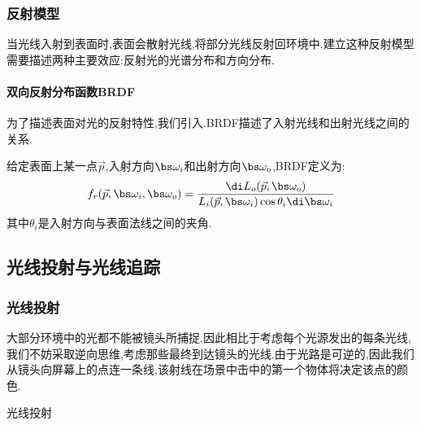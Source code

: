 \documentclass{ctexart}
\begin{document}
\subsubsection{反射模型}
当光线入射到表面时,表面会散射光线,将部分光线反射回环境中.建立这种反射模型需要描述两种主要效应:反射光的光谱分布和方向分布.
\paragraph{双向反射分布函数BRDF}
为了描述表面对光的反射特性,我们引入.BRDF描述了入射光线和出射光线之间的关系.
\begin{definition}[双向反射分布函数]
    给定表面上某一点$\vec{p}$,入射方向$\bs\omega_i$和出射方向$\bs\omega_o$,BRDF定义为:
    \[f_r(\vec{p},\bs\omega_i,\bs\omega_o)=\dfrac{\di L_o(\vec{p},\bs\omega_o)}{L_i(\vec{p},\bs\omega_i)\cos\theta_i\di\bs\omega_i}\]
    其中$\theta_i$是入射方向与表面法线之间的夹角.
\end{definition}
\subsection{光线投射与光线追踪}
\subsubsection{光线投射}
大部分环境中的光都不能被镜头所捕捉,因此相比于考虑每个光源发出的每条光线,我们不妨采取逆向思维,考虑那些最终到达镜头的光线.由于光路是可逆的,因此我们从镜头向屏幕上的点连一条线,该射线在场景中击中的第一个物体将决定该点的颜色.
\begin{definition}[光线透射]
    光线投射
\end{definition}
\end{document}
